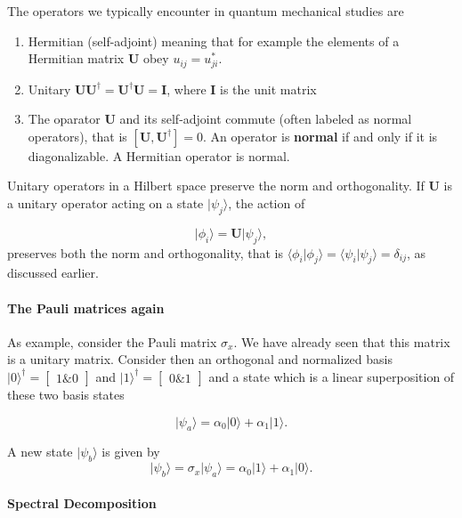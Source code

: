 The operators we typically encounter in quantum mechanical studies are
\begin{enumerate}
\item Hermitian (self-adjoint) meaning that for example the elements of a Hermitian matrix $\bm{U}$ obey $u_{ij}=u_{ji}^*$.

\item Unitary $\bm{U}\bm{U}^{\dagger}=\bm{U}^{\dagger}\bm{U}=\bm{I}$, where $\bm{I}$ is the unit matrix

\item The oparator $\bm{U}$ and its self-adjoint commute (often labeled as normal operators), that is  $[\bm{U},\bm{U}^{\dagger}]=0$. An operator is \textbf{normal} if and only if it is diagonalizable. A Hermitian operator is normal.
\end{enumerate}


Unitary operators in a Hilbert space preserve the norm and orthogonality. If $\bm{U}$ is a unitary operator acting on a state $\vert \psi_j\rangle$, the action of

\[
\vert \phi_i\rangle=\bm{U}\vert \psi_j\rangle,
\]
preserves both the norm and orthogonality, that is $\langle \phi_i \vert \phi_j\rangle=\langle \psi_i \vert \psi_j\rangle=\delta_{ij}$, as discussed earlier.


\paragraph{The Pauli matrices again}

As example, consider the Pauli matrix $\sigma_x$. We have already seen that this matrix is a unitary matrix. Consider then an orthogonal and normalized basis $\vert 0\rangle^{\dagger} =\begin{bmatrix} 1 {\&} 0\end{bmatrix}$ and $\vert 1\rangle^{\dagger} =\begin{bmatrix} 0 {\&} 1\end{bmatrix}$ and a state which is a linear superposition of these two basis states

\[
\vert \psi_a\rangle=\alpha_0\vert 0\rangle +\alpha_1\vert 1\rangle.
\]

A new state $\vert \psi_b\rangle$ is given by
\[
\vert \psi_b\rangle=\sigma_x\vert \psi_a\rangle=\alpha_0\vert 1\rangle +\alpha_1\vert 0\rangle.
\]


\paragraph{Spectral Decomposition}

